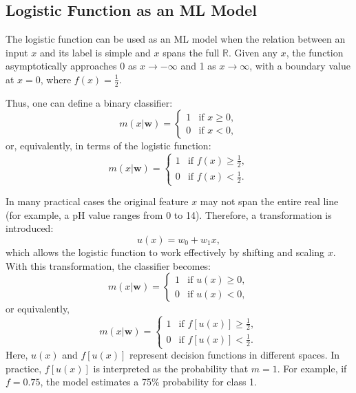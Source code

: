 \documentclass[12pt]{article}
\begin{document}
\subsection{Logistic Function as an ML Model}
The logistic function can be used as an ML model when the relation between an input $x$ and its label is simple and $x$ spans the full $\mathbb{R}$. Given any $x$, the function asymptotically approaches 0 as $x\to -\infty$ and 1 as $x\to \infty$, with a boundary value at $x=0$, where $f(x)=\frac{1}{2}$.

Thus, one can define a binary classifier:
\begin{equation}
    m(x|\bm{w}) = \begin{cases} 
      1 & \text{if } x \geq 0, \\
      0 & \text{if } x < 0,
    \end{cases}
    \label{t04eq03}
\end{equation}
or, equivalently, in terms of the logistic function:
\begin{equation}
    m(x|\bm{w}) = \begin{cases} 
      1 & \text{if } f(x) \geq \frac{1}{2}, \\
      0 & \text{if } f(x) < \frac{1}{2}.
    \end{cases}
    \label{t04eq04}
\end{equation}

In many practical cases the original feature $x$ may not span the entire real line (for example, a pH value ranges from 0 to 14). Therefore, a transformation is introduced:
\begin{equation}
    u(x) = w_0 + w_1 x,
    \label{t04eq05}
\end{equation}
which allows the logistic function to work effectively by shifting and scaling $x$. With this transformation, the classifier becomes:
\begin{equation}
    m(x|\bm{w}) = \begin{cases} 
      1 & \text{if } u(x) \geq 0, \\
      0 & \text{if } u(x) < 0,
    \end{cases}
    \label{t04eq06}
\end{equation}
or equivalently,
\begin{equation}
    m(x|\bm{w}) = \begin{cases} 
      1 & \text{if } f[u(x)] \geq \frac{1}{2}, \\
      0 & \text{if } f[u(x)] < \frac{1}{2}.
    \end{cases}
    \label{t04eq07}
\end{equation}
Here, $u(x)$ and $f[u(x)]$ represent decision functions in different spaces. In practice, $f[u(x)]$ is interpreted as the probability that $m=1$. For example, if $f=0.75$, the model estimates a 75\% probability for class 1.
\end{document}
